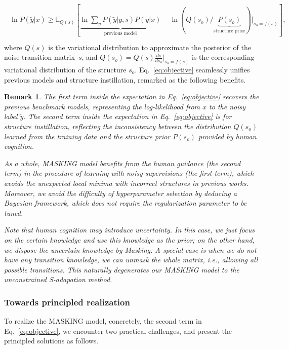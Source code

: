 \documentclass{article}
\newtheorem{remark}{Remark}
\begin{document}
\begin{align}\label{eq:objective}
\begin{split}
\ln{P(\tilde{y}|x)} \geq \mathbb{E}_{Q(s)} \left[ \underbrace{\ln{\sum_{y} P(\tilde{y}|y,s)P(y|x)}}_{\text{previous model}} - \ln{\left(Q(s_o)\slash\underbrace{P(s_o)}_{\text{structure prior}}\right)}\Bigg|_{s_o=f(s)} \right],\\
\end{split}
\end{align}
where $Q(s)$ is the variational distribution to approximate the posterior of the noise transition matrix~$s$, and $Q(s_o) = Q(s)\frac{ds}{ds_o}\big|_{s_o=f(s)}$ is the corresponding variational distribution of the structure $s_o$. Eq.~\eqref{eq:objective} seamlessly unifies previous models and structure instillation, remarked as the following benefits.


\begin{remark}\label{remark:components}\upshape
The first term inside the expectation in Eq.~\eqref{eq:objective} recovers the previous benchmark models, representing the log-likelihood from $x$ to the noisy label $\tilde{y}$. The second term inside the expectation in Eq.~\eqref{eq:objective} is for structure instillation, reflecting the inconsistency between the distribution $Q(s_o)$ learned from the training data and the structure prior $P(s_o)$ provided by human cognition.

As a whole, MASKING model benefits from the human guidance (the second term) in the procedure of learning with noisy supervisions (the first term), which avoids the unexpected local minima with incorrect structures in previous works. Moreover, we avoid the difficulty of hyperparameter selection by deducing a Bayesian framework, which does not require the regularization parameter to be tuned.

Note that human cognition may introduce uncertainty. In this case, we just focus on the certain knowledge and use this knowledge as the prior; on the other hand, we dispose the uncertain knowledge by Masking. A special case is when we do not have any transition knowledge, we can unmask the whole matrix, i.e., allowing all possible transitions. This naturally degenerates our MASKING model to the unconstrained S-adapation method.
\end{remark}

\subsubsection{Towards principled realization}\label{two-challenges}
To realize the MASKING model, concretely, the second term in Eq.~\eqref{eq:objective}, we encounter two practical challenges, and present the principled solutions as follows.
\end{document}
